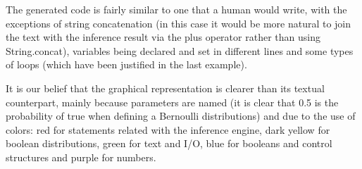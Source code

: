 The generated code is fairly similar to one that a human would
write, with the exceptions of string concatenation (in this case it would be more natural
to join the text with the inference result via the plus operator rather than
using String.concat), variables being declared and set in different lines and some
types of loops (which have been justified in the last example).

It is our belief that the graphical representation is clearer than its textual
counterpart, mainly because parameters are named (it is clear that 0.5 is the
probability of true when defining a Bernoulli distributions) and due to the use
of colors: red for statements related with
the inference engine, dark yellow for boolean distributions, green for text
and I/O, blue for booleans and control structures and purple for numbers.
